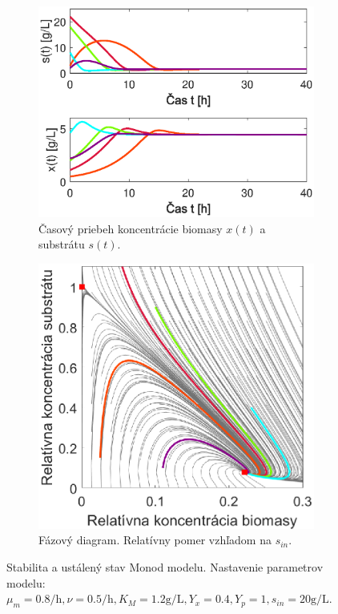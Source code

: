 \begin{figure}
	\centering
	\begin{subfigure}[b]{0.49\textwidth}
		\centering
		\includegraphics[width=\linewidth]{images/phase1_monod}
		\caption{Časový priebeh koncentrácie biomasy $ x(t) $ a substrátu $ s(t) $.}
		\label{fig:fazovy_vyber_monod}
	\end{subfigure}
	\begin{subfigure}[b]{0.49\textwidth}
		\centering
		\includegraphics[width=\linewidth]{images/phase2_monod}
		\caption{Fázový diagram. Relatívny pomer vzhľadom na $ s_{in} $.}
		\label{fig:fazovy_monod}
	\end{subfigure}
	\caption{Stabilita a ustálený stav Monod modelu. Nastavenie parametrov modelu: $ \mu_{m} = 0.8\si{\per\hour}, \nu = 0.5\si{\per\hour}, K_{M} = 1.2\si{\gram\per\liter}, Y_{x} = 0.4, Y_{p} = 1, s_{in} = 20\si{\gram\per\liter} $.}
	\label{fig:stabilita_monod}
\end{figure}

